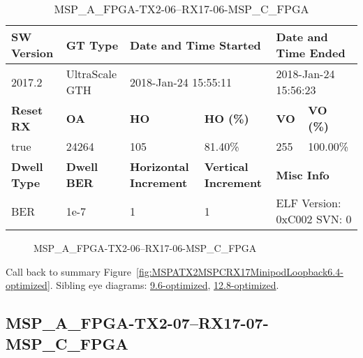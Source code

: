 \begin{table}[h]
\centering
\caption{MSP\_A\_FPGA-TX2-06--RX17-06-MSP\_C\_FPGA}
\label{tab:MSPAFPGATX206RX1706MSPCFPGA6.4-optimized}
\begin{tabular}{@{}|l|l|l|l|l|l|@{}}
\toprule
\textbf{SW Version}                & \textbf{GT Type}   & \multicolumn{2}{l|}{\textbf{Date and Time Started}}            & \multicolumn{2}{l|}{\textbf{Date and Time Ended}}        \\ \midrule
2017.2                       & UltraScale GTH          & \multicolumn{2}{l|}{2018-Jan-24 15:55:11}                   & \multicolumn{2}{l|}{2018-Jan-24 15:56:23}               \\ \midrule
\textbf{Reset RX}                  & \textbf{OA} & \textbf{HO}   & \textbf{HO (\%)} & \textbf{VO} & \textbf{VO (\%)} \\ \midrule
true & 24264        & 105          & 81.40\%        & 255        & 100.00\%       \\ \midrule
\textbf{Dwell Type}                & \textbf{Dwell BER} & \textbf{Horizontal Increment} & \textbf{Vertical Increment}    & \multicolumn{2}{l|}{\textbf{Misc Info}}                  \\ \midrule
BER                            & 1e-7        & 1        & 1           & \multicolumn{2}{l|}{ELF Version: 0xC002 SVN: 0}                         \\ \bottomrule
\end{tabular}
\end{table}

\begin{figure}[h]
\caption{MSP\_A\_FPGA-TX2-06--RX17-06-MSP\_C\_FPGA} \label{fig:MSPAFPGATX206RX1706MSPCFPGA6.4-optimized}
\end{figure}

Call back to summary Figure~\ref{fig:MSPATX2MSPCRX17MinipodLoopback6.4-optimized}.
Sibling eye diagrams: \hyperref[sec:MSPAFPGATX206RX1706MSPCFPGA9.6-optimized]{9.6-optimized}, \hyperref[sec:MSPAFPGATX206RX1706MSPCFPGA12.8-optimized]{12.8-optimized}.

\clearpage
\newpage


\subsection{MSP\_A\_FPGA-TX2-07--RX17-07-MSP\_C\_FPGA}\label{sec:MSPAFPGATX207RX1707MSPCFPGA6.4-optimized}

